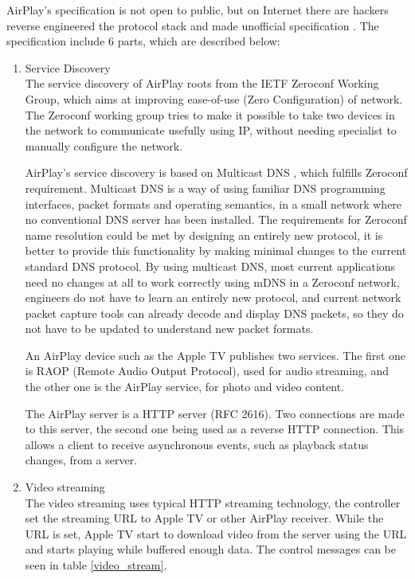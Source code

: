 AirPlay's specification is not open to public, but on Internet there are 
hackers reverse engineered the protocol stack and made unofficial specification 
\cite{AirPlay-spec}. The specification include 6 parts, which are described 
below: 

\begin{enumerate} 
\item Service Discovery \\ 
The service discovery of AirPlay roots from the IETF Zeroconf Working Group, 
which aims at improving ease-of-use (Zero Configuration) of network. The 
Zeroconf working group tries to make it possible to take two devices in the 
network to communicate usefully using IP, without needing specialist to manually 
configure the network. 

AirPlay's service discovery is based on Multicast DNS \cite{multicastdns}, which 
fulfills Zeroconf requirement. Multicast DNS is a way of using familiar DNS 
programming interfaces, packet formats and operating semantics, in a small 
network where no conventional DNS server has been installed. The requirements 
for Zeroconf name resolution could be met by designing an entirely new 
protocol, it is better to provide this functionality by making minimal changes 
to the current standard DNS protocol. By using multicast DNS, most current 
applications need no changes at all to work correctly using mDNS in a Zeroconf network, 
engineers do not have to learn an entirely new protocol, and current network 
packet capture tools can already decode and display DNS packets, so they do not 
have to be updated to understand new packet formats. 

An AirPlay device such as the Apple TV publishes two services. The first one is 
RAOP (Remote Audio Output Protocol), used for audio streaming, and the other 
one is the AirPlay service, for photo and video content. 

The AirPlay server is a HTTP server (RFC 2616). Two connections are made to this 
server, the second one being used as a reverse HTTP connection. This allows a 
client to receive asynchronous events, such as playback status changes, from a 
server. 
\item Video streaming \\ 
The video streaming uses typical HTTP streaming technology, the controller set 
the streaming URL to Apple TV or other AirPlay receiver. While the URL is set, 
Apple TV start to download video from the server using the URL and starts 
playing while buffered enough data. The control messages can be seen in 
table \ref{video_stream}. 


\end{enumerate}
